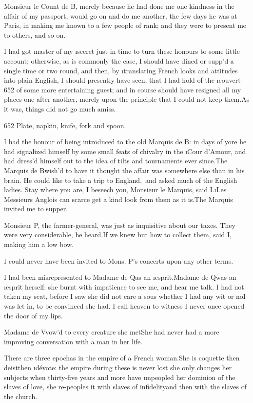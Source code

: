 \documentclass[twoside]{article}
\begin{document}
Monsieur le Count de B\anon, merely
because he had done me one kindness in the
affair of my passport, would go on and do
me another, the few days he was at Paris,
in making me known to a few people of
rank; and they were to present me to
others, and so on.

I had got master of my \i{secret} just in
time to turn these honours to some little
account; otherwise, as is commonly the
case, I should have dined or supp’d a
single time or two round, and then, by
\i{translating} French looks and attitudes
into plain English, I should presently
have seen, that I had hold of the
\i{couvert} {652} of some more
entertaining guest; and in course should
have resigned all my places one after
another, merely upon the principle that I
could not keep them.\tskk As it was,
things did not go much amiss.

{652}  Plate, napkin, knife, fork and
spoon.

I had the honour of being introduced to
the old Marquis de B\tskk : in days of
yore he had signalized himself by some
small feats of chivalry in the \i{Cour
d’Amour}, and had dress’d himself out to
the idea of tilts and tournaments ever
since.\tskk The Marquis de B\tskk  wish’d
to have it thought the affair was
somewhere else than in his brain.  \lqq He
could like to take a trip to England,\rqq\ and
asked much of the English ladies.\tskk
Stay where you are, I beseech you,
Monsieur le Marquis, said I.\tskk \i{Les
Messieurs Anglois} can scarce get a kind
look from them as it is.\tskk The Marquis
invited me to supper.

Monsieur P\tskk , the farmer-general, was
just as inquisitive about our taxes.  They
were very considerable, he heard.\tskk If
we knew but how to collect them, said I,
making him a low bow.

I could never have been invited to Mons.
P\tskk ’s concerts upon any other terms.

I had been misrepresented to Madame de
Q\tskk  as an \i{esprit}.\tskk Madame de
Q\tskk  was an \i{esprit} herself: she
burnt with impatience to see me, and hear
me talk.  I had not taken my seat, before
I saw she did not care a sous whether I
had any wit or no\tskk I was let in, to
be convinced she had.  I call heaven to
witness I never once opened the door of my
lips.

Madame de V\tskk  vow’d to every creature
she met\tskk \lqq She had never had a more
improving conversation with a man in her
life.\rqq 

There are three epochas in the empire of a
French woman.\tskk She is coquette\tskk
then deist\tskk then \i{dévote}: the
empire during these is never lost\tskk
she only changes her subjects when
thirty-five years and more have unpeopled
her dominion of the slaves of love, she
re-peoples it with slaves of
infidelity\tskk and then with the slaves
of the church.
\end{document}

